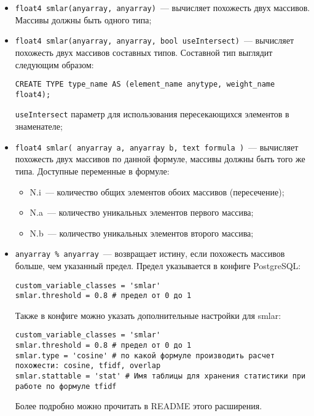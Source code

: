 \begin{itemize}
  \item \lstinline!float4 smlar(anyarray, anyarray)!~--- вычисляет похожесть двух массивов. Массивы должны быть одного типа;
  \item \lstinline!float4 smlar(anyarray, anyarray, bool useIntersect)!~--- вычисляет похожесть двух массивов составных типов. Составной тип выглядит следующим образом:

\begin{lstlisting}[label=lst:smlar5,caption=Составной тип]
CREATE TYPE type_name AS (element_name anytype, weight_name float4);
\end{lstlisting}

  \lstinline!useIntersect! параметр для использования пересекающихся элементов в знаменателе;
  \item \lstinline!float4 smlar( anyarray a, anyarray b, text formula )!~--- вычисляет похожесть двух массивов по данной формуле, массивы должны быть того же типа. Доступные переменные в формуле:

    \begin{itemize}
      \item N.i~--- количество общих элементов обоих массивов (пересечение);
      \item N.a~--- количество уникальных элементов первого массива;
      \item N.b~--- количество уникальных элементов второго массива;
    \end{itemize}

  \item \lstinline!anyarray % anyarray!~--- возвращает истину, если похожесть массивов больше, чем указанный предел. Предел указывается в конфиге PostgreSQL:

\begin{lstlisting}[label=lst:smlar6,caption=Smlar предел]
custom_variable_classes = 'smlar'
smlar.threshold = 0.8 # предел от 0 до 1
\end{lstlisting}

Также в конфиге можно указать дополнительные настройки для smlar:

\begin{lstlisting}[label=lst:smlar7,caption=Smlar настройки]
custom_variable_classes = 'smlar'
smlar.threshold = 0.8 # предел от 0 до 1
smlar.type = 'cosine' # по какой формуле производить расчет похожести: cosine, tfidf, overlap
smlar.stattable = 'stat' # Имя таблицы для хранения статистики при работе по формуле tfidf
\end{lstlisting}

Более подробно можно прочитать в README этого расширения.
\end{itemize}

